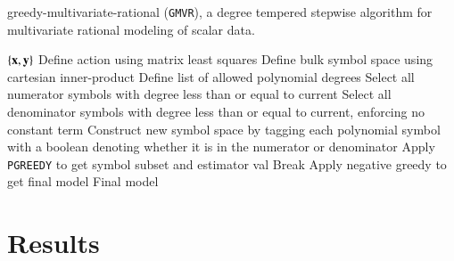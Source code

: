 \documentclass[twocolumn,aps,prd,floatfix,preprintnumbers,a4paper,nofootinbib,
superscriptaddress,10pt]{revtex4-1}
\def\gmvr#1{greedy-multivariate-rational#1
  (\texttt{GMVR}#1)\gdef\gmvr{\texttt{GMVR}}}
\begin{document}
\hspace{1cm}
{\scriptsize
\begin{algorithm}[H]
  \caption{\gmvr{}, a degree tempered stepwise algorithm for multivariate rational modeling of scalar data.}
  \label{alg:gmvr}
  \begin{algorithmic}[1]
     $ \{ \bf{x}, \bf{y} \}$
    \vskip 10pt
    \State Define action using matrix least squares
    \State Define bulk symbol space using cartesian inner-product
    \State Define list of allowed polynomial degrees
      \State Select all numerator symbols with degree less than or equal to current
      \State Select all denominator symbols with degree less than or equal to current, enforcing no constant term
      \State Construct new symbol space by tagging each polynomial symbol with a boolean denoting whether it is in the numerator or denominator
      \State Apply \texttt{PGREEDY} to get symbol subset and estimator val
        \State Break
      \EndIf
    \EndFor
    \State Apply negative greedy to get final model
    \vskip 10pt
     Final model
  \end{algorithmic}
\end{algorithm}
}

%
\section{Results}
\label{results}

\begin{widetext}
	
\end{widetext}

\begin{widetext}
  
\end{widetext}
\end{document}
